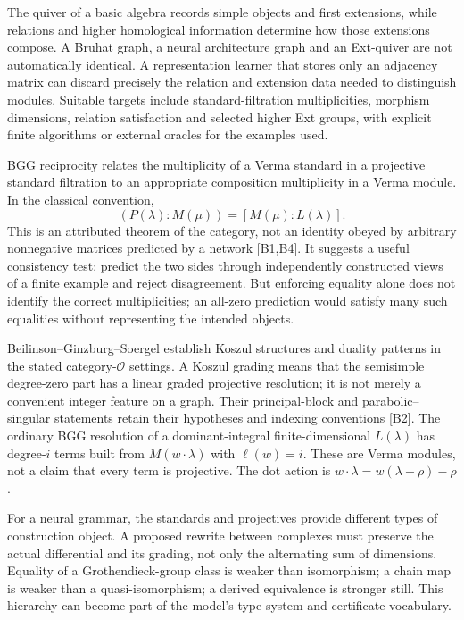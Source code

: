 The quiver of a basic algebra records simple objects and first extensions, while relations and higher homological information determine how those extensions compose. A Bruhat graph, a neural architecture graph and an Ext-quiver are not automatically identical. A representation learner that stores only an adjacency matrix can discard precisely the relation and extension data needed to distinguish modules. Suitable targets include standard-filtration multiplicities, morphism dimensions, relation satisfaction and selected higher Ext groups, with explicit finite algorithms or external oracles for the examples used.

BGG reciprocity relates the multiplicity of a Verma standard in a projective standard filtration to an appropriate composition multiplicity in a Verma module. In the classical convention,
\[
 (P(\lambda):M(\mu))=[M(\mu):L(\lambda)].
\]
This is an attributed theorem of the category, not an identity obeyed by arbitrary nonnegative matrices predicted by a network [B1,B4]. It suggests a useful consistency test: predict the two sides through independently constructed views of a finite example and reject disagreement. But enforcing equality alone does not identify the correct multiplicities; an all-zero prediction would satisfy many such equalities without representing the intended objects.

Beilinson--Ginzburg--Soergel establish Koszul structures and duality patterns in the stated category-$\mathcal O$ settings. A Koszul grading means that the semisimple degree-zero part has a linear graded projective resolution; it is not merely a convenient integer feature on a graph. Their principal-block and parabolic--singular statements retain their hypotheses and indexing conventions [B2]. The ordinary BGG resolution of a dominant-integral finite-dimensional $L(\lambda)$ has degree-$i$ terms built from $M(w\cdot\lambda)$ with $\ell(w)=i$. These are Verma modules, not a claim that every term is projective. The dot action is $w\cdot\lambda=w(\lambda+\rho)-\rho$.

For a neural grammar, the standards and projectives provide different types of construction object. A proposed rewrite between complexes must preserve the actual differential and its grading, not only the alternating sum of dimensions. Equality of a Grothendieck-group class is weaker than isomorphism; a chain map is weaker than a quasi-isomorphism; a derived equivalence is stronger still. This hierarchy can become part of the model's type system and certificate vocabulary.

